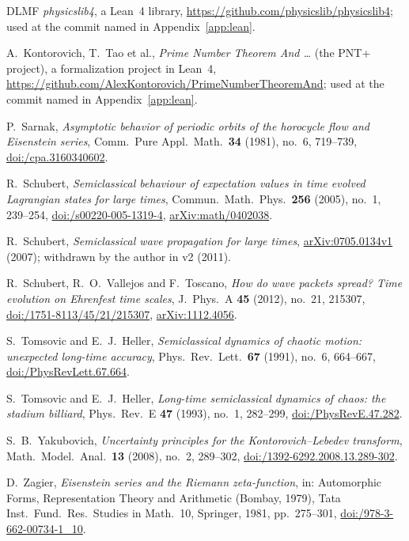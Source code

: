 \documentclass[twoside,10pt]{article}
\numberwithin{equation}{section}
\theoremstyle{slbody}
\theoremstyle{remark}
\begin{document}
\begin{thebibliography}{DLMF}
\emph{physicslib4}, a Lean~4 library,
\url{https://github.com/physicslib/physicslib4}; used at the commit named in Appendix~\ref{app:lean}.

A.~Kontorovich, T.~Tao et al.,
\emph{Prime Number Theorem And \dots} (the PNT+ project), a formalization project in Lean~4,
\url{https://github.com/AlexKontorovich/PrimeNumberTheoremAnd}; used at the commit named in Appendix~\ref{app:lean}.

P.~Sarnak,
\emph{Asymptotic behavior of periodic orbits of the horocycle flow and Eisenstein series},
Comm.\ Pure Appl.\ Math.\ \textbf{34} (1981), no.~6, 719--739,
\href{https://doi.org/10.1002/cpa.3160340602}{doi:/cpa.3160340602}.

R.~Schubert,
\emph{Semiclassical behaviour of expectation values in time evolved Lagrangian
states for large times},
Commun.\ Math.\ Phys.\ \textbf{256} (2005), no.~1, 239--254,
\href{https://doi.org/10.1007/s00220-005-1319-4}{doi:/s00220-005-1319-4},
\href{https://arxiv.org/abs/math/0402038}{arXiv:math/0402038}.

R.~Schubert,
\emph{Semiclassical wave propagation for large times},
\href{https://arxiv.org/abs/0705.0134v1}{arXiv:0705.0134v1} (2007);
withdrawn by the author in v2 (2011).

R.~Schubert, R.~O.~Vallejos and F.~Toscano,
\emph{How do wave packets spread? Time evolution on Ehrenfest time scales},
J.\ Phys.\ A \textbf{45} (2012), no.~21, 215307,
\href{https://doi.org/10.1088/1751-8113/45/21/215307}{doi:/1751-8113/45/21/215307},
\href{https://arxiv.org/abs/1112.4056}{arXiv:1112.4056}.

S.~Tomsovic and E.~J.~Heller,
\emph{Semiclassical dynamics of chaotic motion: unexpected long-time accuracy},
Phys.\ Rev.\ Lett.\ \textbf{67} (1991), no.~6, 664--667,
\href{https://doi.org/10.1103/PhysRevLett.67.664}{doi:/PhysRevLett.67.664}.

S.~Tomsovic and E.~J.~Heller,
\emph{Long-time semiclassical dynamics of chaos: the stadium billiard},
Phys.\ Rev.\ E \textbf{47} (1993), no.~1, 282--299,
\href{https://doi.org/10.1103/PhysRevE.47.282}{doi:/PhysRevE.47.282}.

S.~B.~Yakubovich,
\emph{Uncertainty principles for the Kontorovich--Lebedev transform},
Math.\ Model.\ Anal.\ \textbf{13} (2008), no.~2, 289--302,
\href{https://doi.org/10.3846/1392-6292.2008.13.289-302}{doi:/1392-6292.2008.13.289-302}.

D.~Zagier,
\emph{Eisenstein series and the Riemann zeta-function},
in: Automorphic Forms, Representation Theory and Arithmetic (Bombay, 1979),
Tata Inst.\ Fund.\ Res.\ Studies in Math.\ 10, Springer, 1981, pp.~275--301,
\href{https://doi.org/10.1007/978-3-662-00734-1_10}{doi:/978-3-662-00734-1\_10}.

\end{thebibliography}
\end{document}
